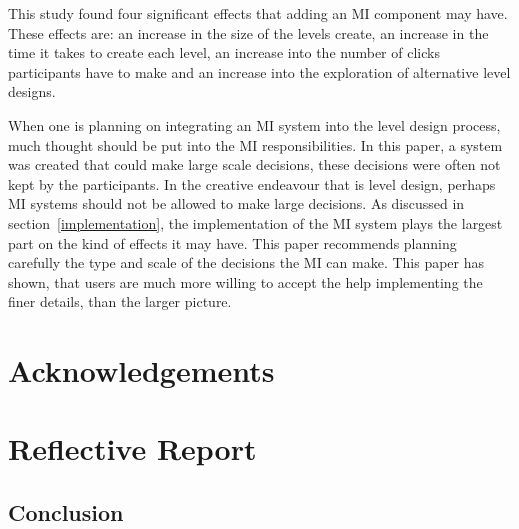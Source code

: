 \documentclass[journal]{IEEEtran}
\begin{document}
This study found four significant effects that adding an MI component may have. These effects are: an increase in the size of the levels create, an increase in the time it takes to create each level, an increase into the number of clicks participants have to make and an increase into the exploration of alternative level designs. 

When one is planning on integrating an MI system into the level design process, much thought should be put into the MI responsibilities. In this paper, a system was created that could make large scale decisions, these decisions were often not kept by the participants. In the creative endeavour that is level design, perhaps MI systems should not be allowed to make large decisions. As discussed in section~\ref{implementation}, the implementation of the MI system plays the largest part on the kind of effects it may have. This paper recommends planning carefully the type and scale of the decisions the MI can make. This paper has shown, that users are much more willing to accept the help implementing the finer details, than the larger picture.







\appendices
	\section{Acknowledgements}

	\section{Reflective Report}

	\subsection{Conclusion}




\end{document}
